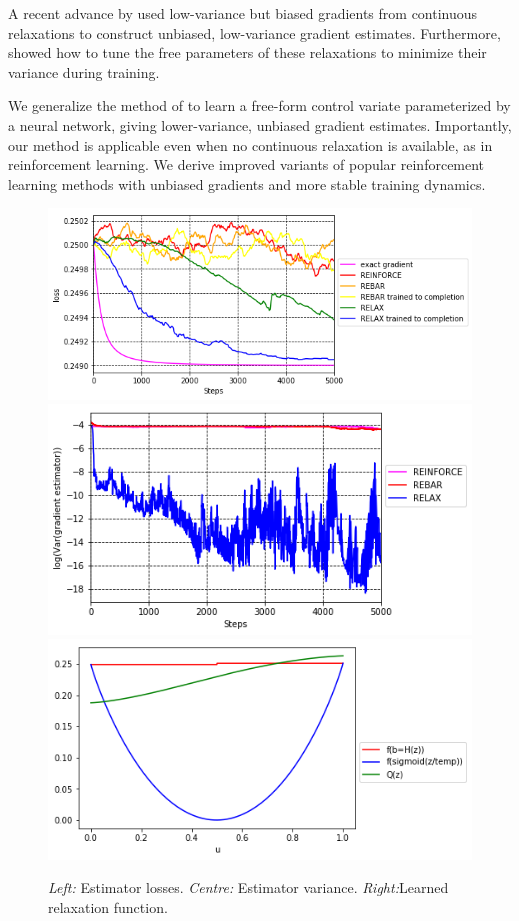 \documentclass{article}
\begin{document}
A recent advance by \citet{tucker2017rebar} used low-variance but biased gradients from continuous relaxations to construct unbiased, low-variance gradient estimates.
Furthermore, \citet{tucker2017rebar} showed how to tune the free parameters of these relaxations to minimize their variance during training.

We generalize the method of \citet{tucker2017rebar} to learn a free-form control variate parameterized by a neural network, giving lower-variance, unbiased gradient estimates.
Importantly, our method is applicable even when no continuous relaxation is available, as in reinforcement learning.
We derive improved variants of popular reinforcement learning methods with unbiased gradients and more stable training dynamics.


\begin{figure}[h]
\begin{center}
\includegraphics[width=.3\textwidth]{figures/losses}
\includegraphics[width=.3\textwidth]{figures/variance_no_opt}
\includegraphics[width=.3\textwidth]{figures/learned_r}
\label{first figure}
\end{center}
\caption{
\emph{Left:} Estimator losses.
\emph{Centre:} Estimator variance.
\emph{Right:}Learned relaxation function.
}
\end{figure}
\end{document}
